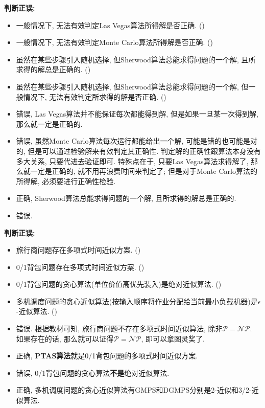 \documentclass{article}
\begin{document}
\begin{homeworkProblem}
	\textbf{判断正误:}
	\begin{itemize}
		\item 一般情况下, 无法有效判定Las Vegas算法所得解是否正确. (\quad)
		\item 一般情况下, 无法有效判定Monte Carlo算法所得解是否正确. (\quad)
		\item 虽然在某些步骤引入随机选择, 但Sherwood算法总能求得问题的一个解, 且所求得的解总是正确的. (\quad)
		\item 虽然在某些步骤引入随机选择, 但Sherwood算法总能求得问题的一个解, 但一般情况下, 无法有效判定所求得的解是否正确. (\quad)
	\end{itemize}
	\solution
	\begin{itemize}
		\item 错误, Las Vegas算法并不能保证每次都能得到解, 但是如果一旦某一次得到解, 那么就一定是正确的.
		\item 错误, 虽然Monte Carlo算法每次运行都能给出一个解, 可能是错的也可能是对的, 但是可以通过检验解来有效判定其正确性. 判定解的正确性跟算法本身没有多大关系, 只要代进去验证即可. 特殊点在于, 只要Las Vegas算法求得解了, 那么就一定是正确的, 就不用再浪费时间来判定了; 但是对于Monte Carlo算法的所得解, 必须要进行正确性检验.
		\item 正确, Sherwood算法总能求得问题的一个解, 且所求得的解总是正确的.
		\item 错误.
	\end{itemize}
\end{homeworkProblem}

\begin{homeworkProblem}
	\textbf{判断正误:}
	\begin{itemize}
		\item 旅行商问题存在多项式时间近似方案. (\quad)
		\item 0/1背包问题存在多项式时间近似方案. (\quad)
		\item 0/1背包问题的贪心算法(单位价值高优先装入)是绝对近似算法. (\quad)
		\item 多机调度问题的贪心近似算法(按输入顺序将作业分配给当前最小负载机器)是$\epsilon$-近似算法. (\quad)
	\end{itemize}
	\solution
	\begin{itemize}
		\item 错误. 根据教材可知, 旅行商问题不存在多项式时间近似算法, 除非$\mathcal{P}=\mathcal{NP}$. 如果存在的话, 那么就可以证得$\mathcal{P}=\mathcal{NP}$, 即可以拿图灵奖了.
		\item 正确, \textbf{PTAS算法}就是0/1背包问题的多项式时间近似方案.
		\item 错误, 0/1背包问题的贪心算法\textbf{不是}绝对近似算法.
		\item 正确, 多机调度问题的贪心近似算法有GMPS和DGMPS分别是2-近似和3/2-近似算法.
	\end{itemize}
\end{homeworkProblem}
\end{document}
